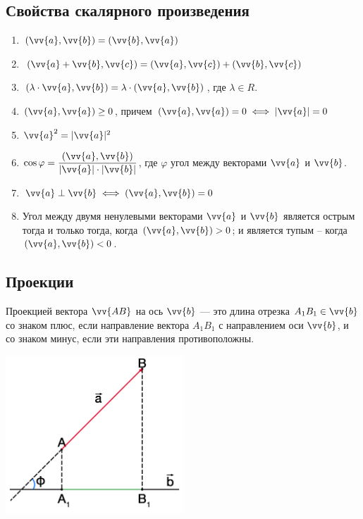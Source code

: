 \documentclass[a4paper,12pt]{extbook}
\theoremstyle{numbered}
\theoremstyle{named}
\theoremstyle{named}
\theoremstyle{named}
\begin{document}
\subsection*{Свойства скалярного произведения}

\begin{enumerate}
    \item \((\vv{a}, \vv{b}) = (\vv{b}, \vv{a})\)

    \item \((\vv{a} + \vv{b}, \vv{c}) = (\vv{a}, \vv{c}) + (\vv{b}, \vv{c})\)

    \item \((\lambda \cdot \vv{a}, \vv{b}) = \lambda \cdot (\vv{a}, \vv{b})\), где \(\lambda \in R\).

    \item \((\vv{a}, \vv{a}) \geq 0\), причем \((\vv{a}, \vv{a}) = 0 \iff |\vv{a}| = 0\)

    \item \(\vv{a}^2 = |\vv{a}|^2\)

    \item \(\cos{\varphi} = \dfrac{(\vv{a}, \vv{b})}{|\vv{a}| \cdot |\vv{b}|}\), где \(\varphi\) угол между векторами \(\vv{a}\) и \(\vv{b}\).

    \item \(\vv{a} \perp \vv{b} \iff (\vv{a}, \vv{b}) = 0\)

    \item Угол между двумя ненулевыми векторами \(\vv{a}\) и \(\vv{b}\) является острым тогда и только тогда, когда \((\vv{a}, \vv{b}) > 0\); и является тупым – когда \((\vv{a}, \vv{b}) < 0\).
\end{enumerate}

\subsection*{Проекции}

Проекцией вектора \(\vv{AB}\) на ось \(\vv{b}\) — это длина отрезка \(A_1B_1 \in \vv{b}\) со знаком плюс, если направление вектора \(A_1B_1\) с направлением оси \(\vv{b}\), и со знаком минус, если эти направления противоположны.

\begin{center}
    \includegraphics[width=0.5\textwidth]{projection.png}
\end{center}
\end{document}
